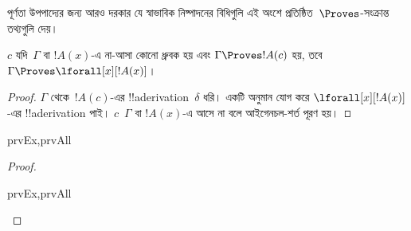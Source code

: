 \documentclass[../../../include/open-logic-section]{subfiles}
\begin{document}


\begin{explain}
  পূর্ণতা উপপাদ্যের জন্য আরও দরকার যে স্বাভাবিক নিষ্পাদনের বিধিগুলি
  এই অংশে প্রতিষ্ঠিত~$\Proves$-সংক্রান্ত তথ্যগুলি দেয়।
\end{explain}

\begin{thm}
 $c$ যদি~$\Gamma$ বা $!A(x)$-এ
না-আসা কোনো ধ্রুবক হয় এবং $\Gamma \Proves !A(c)$ হয়, তবে $\Gamma
\Proves \lforall[x][!A(x)]$।
\end{thm}

\begin{proof}
$\Gamma$ থেকে~$!A(c)$-এর !!a{derivation}~$\delta$ ধরি। একটি
\Intro{\lforall} অনুমান যোগ করে $\lforall[x][!A(x)]$-এর
!!a{derivation} পাই। $c$~$\Gamma$ বা $!A(x)$-এ আসে না বলে
আইগেনচল-শর্ত পূরণ হয়।
\end{proof}

\begin{prop}
\begin{tagenumerate}{prvEx,prvAll}

\end{tagenumerate}
\end{prop}

\begin{proof}
\begin{tagenumerate}{prvEx,prvAll}

\end{tagenumerate}
\end{proof}
\end{document}
